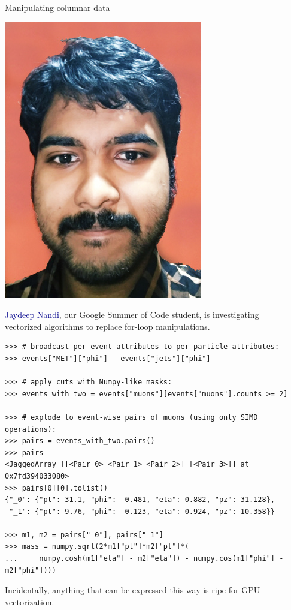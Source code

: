 \documentclass[aspectratio=169]{beamer}
\begin{document}
\begin{frame}[fragile]{Manipulating columnar data}
\vspace{0.3 cm}

\hfill \includegraphics[height=3 cm]{jaydeep.jpg}

\vspace{-3 cm}
\textcolor{darkblue}{Jaydeep Nandi}, our Google Summer of Code student, is investigating \\
vectorized algorithms to replace for-loop manipulations.

\vspace{0.1 cm}
\scriptsize
\begin{verbatim}
>>> # broadcast per-event attributes to per-particle attributes:
>>> events["MET"]["phi"] - events["jets"]["phi"]

>>> # apply cuts with Numpy-like masks:
>>> events_with_two = events["muons"][events["muons"].counts >= 2]

>>> # explode to event-wise pairs of muons (using only SIMD operations):
>>> pairs = events_with_two.pairs()
>>> pairs
<JaggedArray [[<Pair 0> <Pair 1> <Pair 2>] [<Pair 3>]] at 0x7fd394033080>
>>> pairs[0][0].tolist()
{"_0": {"pt": 31.1, "phi": -0.481, "eta": 0.882, "pz": 31.128},
 "_1": {"pt": 9.76, "phi": -0.123, "eta": 0.924, "pz": 10.358}}

>>> m1, m2 = pairs["_0"], pairs["_1"]
>>> mass = numpy.sqrt(2*m1["pt"]*m2["pt"]*(
...     numpy.cosh(m1["eta"] - m2["eta"]) - numpy.cos(m1["phi"] - m2["phi"])))
\end{verbatim}

\normalsize
\vspace{0.1 cm}
Incidentally, anything that can be expressed this way is ripe for GPU vectorization.
\end{frame}
\end{document}
